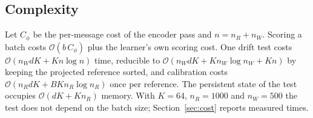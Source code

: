 \subsection{Complexity}\label{sec:complexity}
Let $C_\phi$ be the per-message cost of the encoder pass and $n=n_R+n_W$. Scoring a batch costs $\mathcal{O}(b\,C_\phi)$ plus the learner's own scoring cost. One drift test costs $\mathcal{O}(n_WdK+Kn\log n)$ time, reducible to $\mathcal{O}(n_WdK+Kn_W\log n_W+Kn)$ by keeping the projected reference sorted, and calibration costs $\mathcal{O}(n_RdK+BKn_R\log n_R)$ once per reference. The persistent state of the test occupies $\mathcal{O}(dK+Kn_R)$ memory. With $K=64$, $n_R=1000$ and $n_W=500$ the test does not depend on the batch size; Section~\ref{sec:cost} reports measured times.
